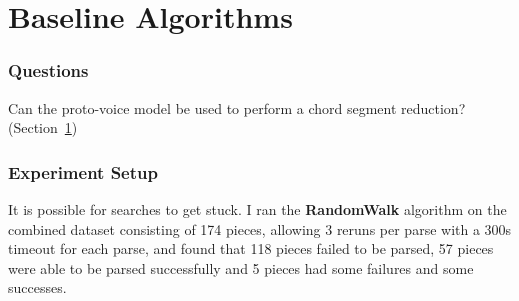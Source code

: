 \documentclass[12pt,a4paper,twoside,openany]{report} \usepackage[pdfborder={0 0 0}]{hyperref}    %
\theoremstyle{definition} \newtheorem{definition}{Definition}[section]
\begin{document}

  \section{Baseline Algorithms} 
  \label{sec:evalBaseline}
  \subsubsection{Questions}
  \item Can the proto-voice model be used to perform a chord segment reduction? (Section~\ref{sec:evalBaseline})

  \subsubsection{Experiment Setup}
  It is possible for searches to get stuck. I ran the \textbf{RandomWalk} algorithm on the combined dataset consisting
  of 174 pieces, allowing 3 reruns per parse with a 300s timeout for each parse, and found that 118 pieces failed to be parsed, 57 pieces were able to be
  parsed successfully and 5 pieces had some failures and some successes. 
\end{document}
